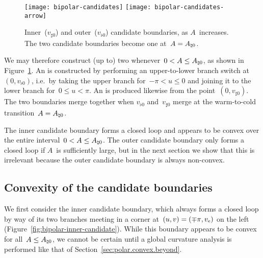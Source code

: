 \begin{figure}
  \centering
  \texttt{[image: bipolar-candidates]}
  \texttt{[image: bipolar-candidates-arrow]}
  \caption{
    Inner~($v_{\sharp 0}$) and outer~($v_{\flat 0}$) candidate boundaries,
    as $A$~increases.
    The two candidate boundaries become one at~$A = A_{\natural 0}$.
  }
  \label{fig:bipolar-candidates}
\end{figure}

We may therefore construct (up to) two 
whenever~$0 < A \le A_{\natural 0}$,
as shown in Figure~\ref{fig:bipolar-candidates}.
An  is constructed
by performing an upper-to-lower branch switch at~$(0, v_{\flat 0})$,
i.e.~by taking the upper branch for~$-\pi < u \le 0$
and joining it to the lower branch for~$0 \le u < \pi$.
An  is produced likewise
from the point~$(0, v_{\sharp 0})$.
The two boundaries merge together
when $v_{\flat 0}$ and~$v_{\sharp 0}$ merge
at the warm-to-cold transition~$A = A_{\natural 0}$.

The inner candidate boundary forms a closed loop
and appears to be convex over the entire interval~$0 < A \le A_{\natural 0}$.
The outer candidate boundary only forms a closed loop
if $A$~is sufficiently large,
but in the next section we show that this is irrelevant
because the outer candidate boundary is always non-convex.

\subsection{Convexity of the candidate boundaries}
\label{sec:bipolar.tracing.convex}

We first consider the inner candidate boundary,
which always forms a closed loop
by way of its two branches meeting in a corner
at~$(u, v) = (\mp\pi, v_{\mathrm{e}})$ on the left
(Figure~\ref{fig:bipolar-inner-candidate}).
While this boundary appears to be convex for all~$A \le A_{\natural 0}$,
we cannot be certain until a global curvature analysis is performed
like that of Section~\ref{sec:polar.convex.beyond}.

\begin{figure}
\end{figure}

